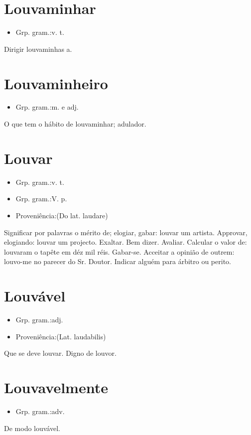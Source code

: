 \section{Louvaminhar}
\begin{itemize}
\item {Grp. gram.:v. t.}
\end{itemize}
Dirigir louvaminhas a.
\section{Louvaminheiro}
\begin{itemize}
\item {Grp. gram.:m.  e  adj.}
\end{itemize}
O que tem o hábito de louvaminhar; adulador.
\section{Louvar}
\begin{itemize}
\item {Grp. gram.:v. t.}
\end{itemize}
\begin{itemize}
\item {Grp. gram.:V. p.}
\end{itemize}
\begin{itemize}
\item {Proveniência:(Do lat. \textunderscore laudare\textunderscore )}
\end{itemize}
Significar por palavras o mérito de; elogiar, gabar: \textunderscore louvar um artista\textunderscore .
Approvar, elogiando: \textunderscore louvar um projecto\textunderscore .
Exaltar.
Bem dizer.
Avaliar.
Calcular o valor de: \textunderscore louvaram o tapête em déz mil réis\textunderscore .
Gabar-se.
Acceitar a opinião de outrem: \textunderscore louvo-me no parecer do Sr. Doutor\textunderscore .
Indicar alguém para árbitro ou perito.
\section{Louvável}
\begin{itemize}
\item {Grp. gram.:adj.}
\end{itemize}
\begin{itemize}
\item {Proveniência:(Lat. \textunderscore laudabilis\textunderscore )}
\end{itemize}
Que se deve louvar.
Digno de louvor.
\section{Louvavelmente}
\begin{itemize}
\item {Grp. gram.:adv.}
\end{itemize}
De modo louvável.
